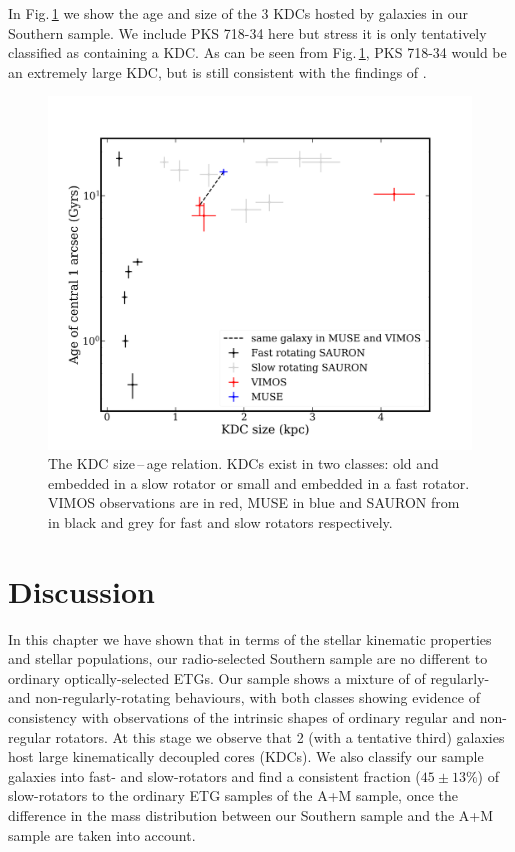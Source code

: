 		In Fig.\,\ref{fig:KDC} we show the age and size of the 3 KDCs hosted by galaxies in our Southern sample. We include PKS 718-34 here but stress it is only tentatively classified as containing a KDC. As can be seen from Fig.\,\ref{fig:KDC}, PKS 718-34 would be an extremely large KDC, but is still consistent with the findings of \citet{Kuntschner2010}.

		\begin{figure}
			\centering
			\includegraphics[width=.7\textwidth]{chapter4/KDC_size_age.png}
			\caption[KDC dichotomy]{The KDC size\,--\,age relation. KDCs exist in two classes: old and embedded in a slow rotator or small and embedded in a fast rotator. VIMOS observations are in red, MUSE in blue and SAURON from \citet{Kuntschner2010} in black and grey for fast and slow rotators respectively.}
			\label{fig:KDC}
		\end{figure}
	
\section{Discussion}
	\label{sec:stellarDiscussion}
	In this chapter we have shown that in terms of the stellar kinematic properties and stellar populations, our radio-selected Southern sample are no different to ordinary optically-selected ETGs. Our sample shows a mixture of of regularly- and non-regularly-rotating behaviours, with both classes showing evidence of consistency with observations of the intrinsic shapes of ordinary regular and non-regular rotators. At this stage we observe that 2 (with a tentative third) galaxies host large kinematically decoupled cores (KDCs). We also classify our sample galaxies into fast- and slow-rotators and find a consistent fraction ($45\pm13$\%) of slow-rotators to the ordinary ETG samples of the A+M sample, once the difference in the mass distribution between our Southern sample and the A+M sample are taken into account. 

